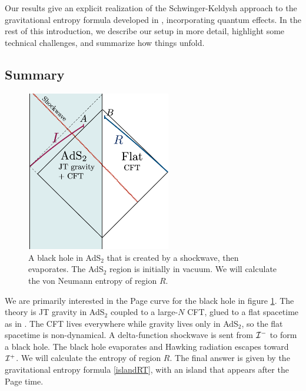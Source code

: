\documentclass[11pt,oneside,letterpaper]{article}
\numberwithin{equation}{section}
\begin{document}
\begin{spacing}{1.1}
\begin{itemize}
\end{itemize}
Our results give an explicit realization of the Schwinger-Keldysh approach to the gravitational entropy formula developed in \cite{Dong:2016hjy}, incorporating quantum effects. 
In the rest of this introduction, we describe our setup in more detail, highlight some technical challenges, and summarize how things unfold.

\subsection{Summary}
\begin{figure}
      \begin{center}
     \includegraphics[height=7cm]{figures/onesided.png}
  \caption{\small A black hole in AdS$_2$ that is created by a shockwave, then evaporates. The AdS$_2$ region is initially in vacuum. We will calculate the von Neumann entropy of region $R$.}
  \label{fig:setup-onesided}
 \end{center}
 \end{figure}
 
We are primarily interested in the Page curve for the black hole in figure \ref{fig:setup-onesided}. The theory is JT gravity in AdS$_2$ coupled to a large-$N$ CFT, glued to a flat spacetime as in \cite{Engelsoy:2016xyb, Almheiri:2019psf}. The CFT lives everywhere while gravity lives only in AdS$_2$, so the flat spacetime is non-dynamical. A delta-function shockwave is sent from ${\cal I}^-$ to form a black hole. The black hole evaporates and Hawking radiation escapes toward ${\cal I}^+$. We will calculate the entropy of region $R$. The final answer \cite{Almheiri:2019psf} is given by the gravitational entropy formula \eqref{islandRT}, with an island that appears after the Page time.


\end{spacing}
\end{document}
